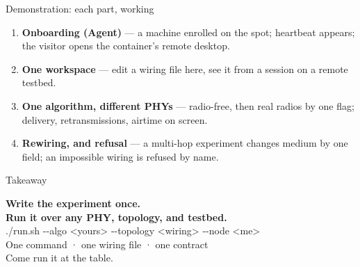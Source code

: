 \documentclass[aspectratio=169,10pt]{beamer}
\newcommand{\mono}[1]{{\ttfamily\small #1}}
\begin{document}
\begin{frame}{Demonstration: each part, working}
  \begin{enumerate}\setlength\itemsep{0.8em}
    \item \textbf{Onboarding (Agent)} --- a machine enrolled on the spot;
      heartbeat appears; the visitor opens the container's remote desktop.
    \item \textbf{One workspace} --- edit a wiring file here, see it from a
      session on a remote testbed.
    \item \textbf{One algorithm, different PHYs} --- radio-free, then real
      radios by one flag; delivery, retransmissions, airtime on screen.
    \item \textbf{Rewiring, and refusal} --- a multi-hop experiment changes
      medium by one field; an impossible wiring is refused by name.
  \end{enumerate}
\end{frame}

\begin{frame}{Takeaway}
  \begin{center}
    {\Large\bfseries Write the experiment once.\\[4pt]
     Run it over any PHY, topology, and testbed.}\\[1.5em]
    \mono{./run.sh -{}-algo <yours> -{}-topology <wiring> -{}-node <me>}\\[2em]
    {\color{uShare} One command · one wiring file · one contract}\\[2em]
    {\small Come run it at the table.}
  \end{center}
\end{frame}
\end{document}
